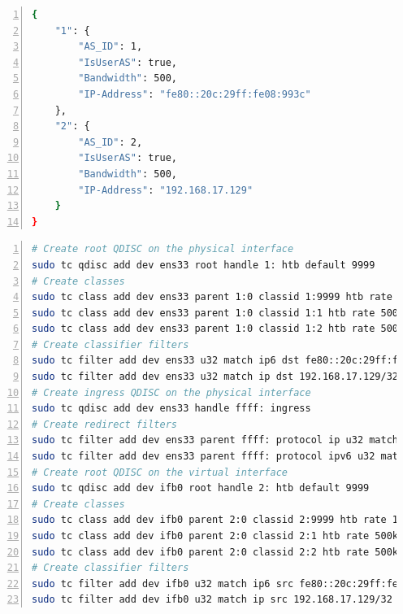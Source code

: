 \begin{lstlisting}[language=sh, caption = link\_info.json, captionpos=b, numbers=left, frame=single, breaklines=true, breakatwhitespace=true, showstringspaces=false, label=link_info.json]
{
    "1": {
        "AS_ID": 1,
        "IsUserAS": true,
        "Bandwidth": 500,
        "IP-Address": "fe80::20c:29ff:fe08:993c"
    },
    "2": {
        "AS_ID": 2,
        "IsUserAS": true,
        "Bandwidth": 500,
        "IP-Address": "192.168.17.129"
    }
}
\end{lstlisting}

\newpage

\begin{lstlisting}[language=sh, caption = TC Configuration, captionpos=b, numbers=left, frame=single, breaklines=true, breakatwhitespace=true, showstringspaces=false, label=TC Configuration, basicstyle=\normalsize]
# Create root QDISC on the physical interface
sudo tc qdisc add dev ens33 root handle 1: htb default 9999
# Create classes
sudo tc class add dev ens33 parent 1:0 classid 1:9999 htb rate 1000kbit ceil 1000kbit burst 5k prio 9999 mtu 1500
sudo tc class add dev ens33 parent 1:0 classid 1:1 htb rate 500kbit ceil 500kbit burst 5k prio 1 mtu 1500
sudo tc class add dev ens33 parent 1:0 classid 1:2 htb rate 500kbit ceil 500kbit burst 5k prio 2 mtu 1500
# Create classifier filters 
sudo tc filter add dev ens33 u32 match ip6 dst fe80::20c:29ff:fe08:993c/128 flowid 1:1
sudo tc filter add dev ens33 u32 match ip dst 192.168.17.129/32 flowid 1:2
# Create ingress QDISC on the physical interface
sudo tc qdisc add dev ens33 handle ffff: ingress
# Create redirect filters
sudo tc filter add dev ens33 parent ffff: protocol ip u32 match ip src 0.0.0.0/0 action mirred egress redirect dev ifb0
sudo tc filter add dev ens33 parent ffff: protocol ipv6 u32 match ip6 src ::0/0 action mirred egress redirect dev ifb0
# Create root QDISC on the virtual interface
sudo tc qdisc add dev ifb0 root handle 2: htb default 9999
# Create classes
sudo tc class add dev ifb0 parent 2:0 classid 2:9999 htb rate 1000kbit ceil 1000kbit burst 5k prio 9999 mtu 1500
sudo tc class add dev ifb0 parent 2:0 classid 2:1 htb rate 500kbit ceil 500kbit burst 5k prio 1 mtu 1500
sudo tc class add dev ifb0 parent 2:0 classid 2:2 htb rate 500kbit ceil 500kbit burst 5k prio 2 mtu 1500
# Create classifier filters
sudo tc filter add dev ifb0 u32 match ip6 src fe80::20c:29ff:fe08:993c/128 flowid 2:1
sudo tc filter add dev ifb0 u32 match ip src 192.168.17.129/32 flowid 2:2
\end{lstlisting}